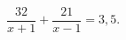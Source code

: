 \begin{ex}[type=equation]
	\begin{condition}
		$\dfrac{32}{x + 1} + \dfrac{21}{x- 1} = 3,5.$
	\end{condition}
\end{ex}